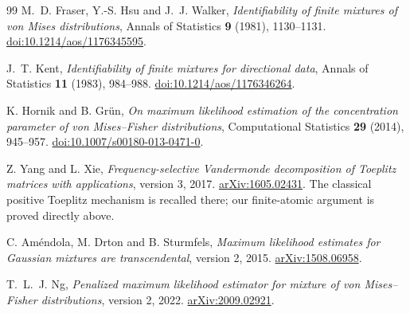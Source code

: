 \documentclass[11pt]{article}
\theoremstyle{definition}
\theoremstyle{remark}
\begin{document}
\begin{thebibliography}{99}
M.~D. Fraser, Y.-S. Hsu and J.~J. Walker,
\emph{Identifiability of finite mixtures of von Mises distributions},
Annals of Statistics \textbf{9} (1981), 1130--1131.
\href{https://doi.org/10.1214/aos/1176345595}{doi:10.1214/aos/1176345595}.

J.~T. Kent, \emph{Identifiability of finite mixtures for directional data},
Annals of Statistics \textbf{11} (1983), 984--988.
\href{https://doi.org/10.1214/aos/1176346264}{doi:10.1214/aos/1176346264}.

K. Hornik and B. Gr\"un,
\emph{On maximum likelihood estimation of the concentration parameter
of von Mises--Fisher distributions}, Computational Statistics
\textbf{29} (2014), 945--957.
\href{https://doi.org/10.1007/s00180-013-0471-0}{doi:10.1007/s00180-013-0471-0}.

Z. Yang and L. Xie, \emph{Frequency-selective Vandermonde decomposition
of Toeplitz matrices with applications}, version 3, 2017.
\href{https://arxiv.org/abs/1605.02431}{arXiv:1605.02431}.
The classical positive Toeplitz mechanism is recalled there; our
finite-atomic argument is proved directly above.

C. Am\'endola, M. Drton and B. Sturmfels,
\emph{Maximum likelihood estimates for Gaussian mixtures are
transcendental}, version 2, 2015.
\href{https://arxiv.org/abs/1508.06958}{arXiv:1508.06958}.

T.~L.~J. Ng, \emph{Penalized maximum likelihood estimator for mixture
of von Mises--Fisher distributions}, version 2, 2022.
\href{https://arxiv.org/abs/2009.02921}{arXiv:2009.02921}.

\end{thebibliography}
\end{document}
